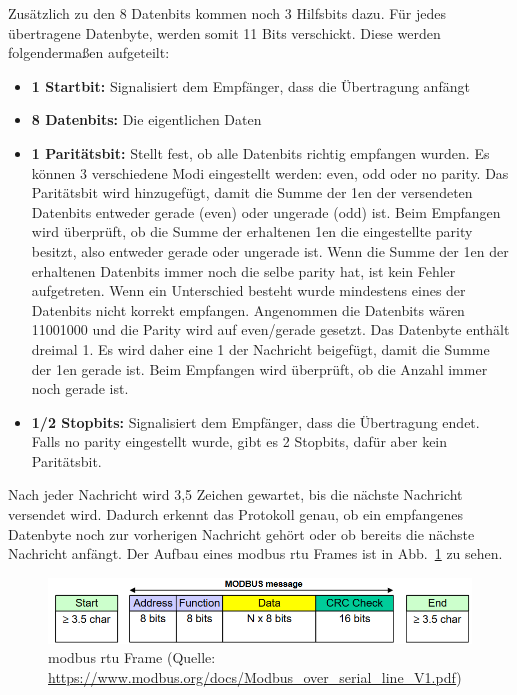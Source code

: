 Zusätzlich zu den 8 Datenbits kommen noch 3 Hilfsbits dazu. Für jedes übertragene Datenbyte, werden somit 11 Bits verschickt. Diese werden folgendermaßen aufgeteilt:
\begin{itemize}
	\item \textbf{1 Startbit:} Signalisiert dem Empfänger, dass die Übertragung anfängt
	\item \textbf{8 Datenbits:} Die eigentlichen Daten	
	\item \textbf{1 Paritätsbit:} Stellt fest, ob alle Datenbits richtig empfangen wurden. Es können 3 verschiedene Modi eingestellt werden: even, odd oder no parity. Das Paritätsbit wird hinzugefügt, damit die Summe der 1en der versendeten Datenbits entweder gerade (even) oder ungerade (odd) ist. Beim Empfangen wird überprüft, ob die Summe der erhaltenen 1en die eingestellte \gls{parity} besitzt, also entweder gerade oder ungerade ist. Wenn die Summe der 1en der erhaltenen Datenbits immer noch die selbe \gls{parity} hat, ist kein Fehler aufgetreten. Wenn ein Unterschied besteht wurde mindestens eines der Datenbits nicht korrekt empfangen. Angenommen die Datenbits wären 11001000 und die Parity wird auf even/gerade gesetzt. Das Datenbyte enthält  dreimal 1. Es wird daher eine 1 der Nachricht beigefügt, damit die Summe der 1en gerade ist. Beim Empfangen wird überprüft, ob die Anzahl immer noch gerade ist. \cite[vgl.][]{IBM_Corporation:2023}	 
	\item \textbf{1/2 Stopbits:} Signalisiert dem Empfänger, dass die Übertragung endet. Falls no parity eingestellt wurde, gibt es 2 Stopbits, dafür aber kein Paritätsbit.
\end{itemize}

Nach jeder Nachricht wird 3,5 Zeichen gewartet, bis die nächste Nachricht versendet wird. Dadurch erkennt das Protokoll genau, ob ein empfangenes Datenbyte noch zur vorherigen Nachricht gehört oder ob bereits die nächste Nachricht anfängt.
Der Aufbau eines \gls{modbus} \acs{rtu} Frames ist in Abb.~\ref{fig:modbus_frame} zu sehen.
\begin{figure}[H]
	\centering
	\includegraphics[width=1.0\linewidth]{Bilder/Modbus_frame}
	\caption{\gls{modbus} \acs{rtu} Frame (Quelle: \url{https://www.modbus.org/docs/Modbus_over_serial_line_V1.pdf})}
	\label{fig:modbus_frame}
\end{figure}


